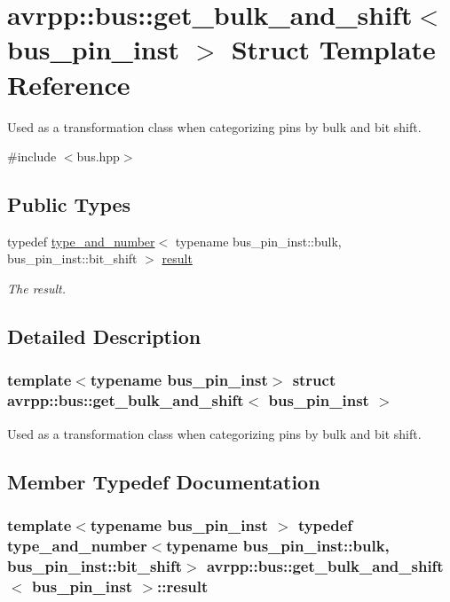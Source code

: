 \hypertarget{structavrpp_1_1bus_1_1get__bulk__and__shift}{
\section{avrpp::bus::get\_\-bulk\_\-and\_\-shift$<$ bus\_\-pin\_\-inst $>$ Struct Template Reference}
\label{structavrpp_1_1bus_1_1get__bulk__and__shift}
}


Used as a transformation class when categorizing pins by bulk and bit shift.  




{\ttfamily \#include $<$bus.hpp$>$}

\subsection*{Public Types}
\begin{DoxyCompactItemize}
\item 
typedef \hyperlink{structavrpp_1_1bus_1_1type__and__number}{type\_\-and\_\-number}$<$ typename bus\_\-pin\_\-inst::bulk, bus\_\-pin\_\-inst::bit\_\-shift $>$ \hyperlink{structavrpp_1_1bus_1_1get__bulk__and__shift_a1d7e4b645b5b084cbbab7e330a6f2708}{result}
\begin{DoxyCompactList}\small\item\em The result. \item\end{DoxyCompactList}\end{DoxyCompactItemize}


\subsection{Detailed Description}
\subsubsection*{template$<$typename bus\_\-pin\_\-inst$>$ struct avrpp::bus::get\_\-bulk\_\-and\_\-shift$<$ bus\_\-pin\_\-inst $>$}

Used as a transformation class when categorizing pins by bulk and bit shift. 

\subsection{Member Typedef Documentation}
\hypertarget{structavrpp_1_1bus_1_1get__bulk__and__shift_a1d7e4b645b5b084cbbab7e330a6f2708}{
\subsubsection[{result}]{\setlength{\rightskip}{0pt plus 5cm}template$<$typename bus\_\-pin\_\-inst $>$ typedef {\bf type\_\-and\_\-number}$<$typename bus\_\-pin\_\-inst::bulk, bus\_\-pin\_\-inst::bit\_\-shift$>$ {\bf avrpp::bus::get\_\-bulk\_\-and\_\-shift}$<$ bus\_\-pin\_\-inst $>$::{\bf result}}}
\label{structavrpp_1_1bus_1_1get__bulk__and__shift_a1d7e4b645b5b084cbbab7e330a6f2708}


